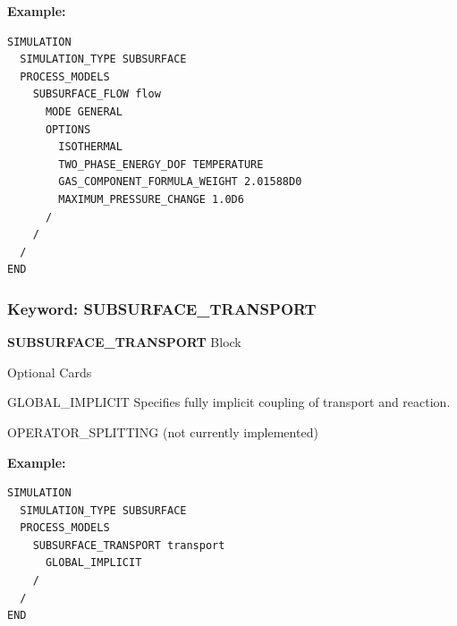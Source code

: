 \small
\begin{mdframed}
{\bf Example:}
\footnotesize
\begin{verbatim}
SIMULATION
  SIMULATION_TYPE SUBSURFACE
  PROCESS_MODELS
    SUBSURFACE_FLOW flow
      MODE GENERAL
      OPTIONS
        ISOTHERMAL
        TWO_PHASE_ENERGY_DOF TEMPERATURE
        GAS_COMPONENT_FORMULA_WEIGHT 2.01588D0
        MAXIMUM_PRESSURE_CHANGE 1.0D6
      /
    /
  /
END
\end{verbatim}
\normalsize
\end{mdframed}
\normalsize

\subsubsection{Keyword: SUBSURFACE\_TRANSPORT}

\begin{description}
\item {\bf SUBSURFACE\_TRANSPORT} Block
\begin{description}
\item Optional Cards
\item GLOBAL\_IMPLICIT
Specifies fully implicit coupling of transport and reaction.
\item OPERATOR\_SPLITTING (not currently implemented)
\end{description}
\end{description}

\small
\begin{mdframed}
{\bf Example:}
\footnotesize
\begin{verbatim}
SIMULATION
  SIMULATION_TYPE SUBSURFACE
  PROCESS_MODELS
    SUBSURFACE_TRANSPORT transport
      GLOBAL_IMPLICIT
    /
  /
END
\end{verbatim}
\normalsize
\end{mdframed}
\normalsize

\newpage
